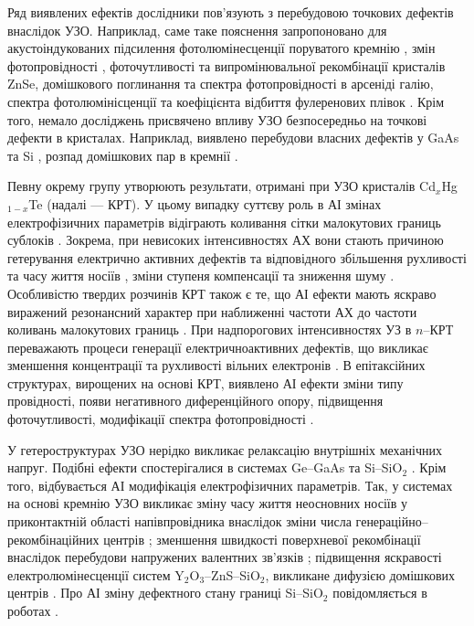 Ряд виявлених ефектів дослідники пов'язують з перебудовою точкових дефектів внаслідок УЗО.
Наприклад, саме таке пояснення запропоновано для акустоіндукованих
підсилення фотолюмінесценції поруватого кремнію \cite{Bahar2003},
змін фотопровідності \cite{US:ZnSe},  фоточутливості та випромінювальної рекомбінації  \cite{ZobovFTP2008} кристалів ZnSe,
домішкового поглинання \cite{Zaver2007} та спектра фотопровідності \cite{UST:GaAs2015} в арсеніді галію,
спектра фотолюмінісценції та коефіцієнта відбиття фулеренових плівок \cite{RITTER2008}.
Крім того, немало досліджень присвячено впливу УЗО безпосередньо на точкові дефекти в кристалах.
Наприклад, виявлено перебудови  власних дефектів у GaAs \cite{Wosinski,Ostapenko1994,buyanova1994} та Si \cite{UST:Onanko},
розпад домішкових пар в кремнії \cite{Ostapenko1995SST,Ostapenko1995,Ostapenko1994APL}.


Певну окрему групу утворюють результати, отримані при УЗО кристалів Cd$_x$Hg$_{1-x}$Te (надалі --- КРТ).
У цьому випадку суттєву роль в АІ змінах електрофізичних параметрів відіграють коливання сітки малокутових границь сублоків \cite{KRT:FTT89,KRT:FTT90}.
Зокрема, при невисоких інтенсивностях АХ вони стають причиною гетерування електрично активних дефектів та відповідного збільшення рухливості та часу життя носіїв \cite{KRT:FTP90,Savkina:SPQEO2006}, зміни ступеня компенсації та зниження шуму \cite{Ol_Shav}.
Особливістю твердих розчинів КРТ також є те, що АІ ефекти мають яскраво виражений резонансний характер при наближенні частоти АХ до частоти коливань малокутових границь \cite{KRT:FTP90,KRT:FTT89,KRT:FTT90,Ol_Shav}.
При надпорогових інтенсивностях УЗ в $n$--КРТ переважають процеси генерації електричноактивних дефектів, що викликає зменшення концентрації та рухливості  вільних електронів \cite{KRT:FTP90,KRT:FTT89}.
В епітаксійних структурах, вирощених на основі КРТ,  виявлено АІ ефекти зміни типу провідності, появи негативного диференційного опору, підвищення фоточутливості, модифікації спектра фотопровідності \cite{Savkina:SST07,SavkinaPSSB2002}.


У гетероструктурах УЗО нерідко викликає релаксацію внутрішніх механічних напруг.
Подібні ефекти спостерігалися в системах Ge--GaAs \cite{BritunFTT,UST:GeGaAs1990} та Si--SiO$_2$ \cite{Zdeb1989}.
Крім того, відбувається АІ модифікація електрофізичних параметрів.
Так, у системах  на основі кремнію УЗО викликає зміну часу життя неосновних носіїв у приконтактній області напівпровідника
внаслідок зміни числа генераційно--рекомбінаційних центрів \cite{Parchinskii2003r,Zdeb1989};
зменшення швидкості поверхневої рекомбінації внаслідок перебудови напружених валентних зв'язків \cite{Vlasov2009r,Parchinskii2003r};
підвищення яскравості електролюмінесценції систем Y$_2$O$_3$--ZnS--SiO$_2$, викликане дифузією домішкових центрів \cite{UST:ZnS}.
Про АІ зміну дефектного стану границі Si--SiO$_2$ повідомляється в роботах \cite{Ostap:SiO2,UST:Medvid}.


